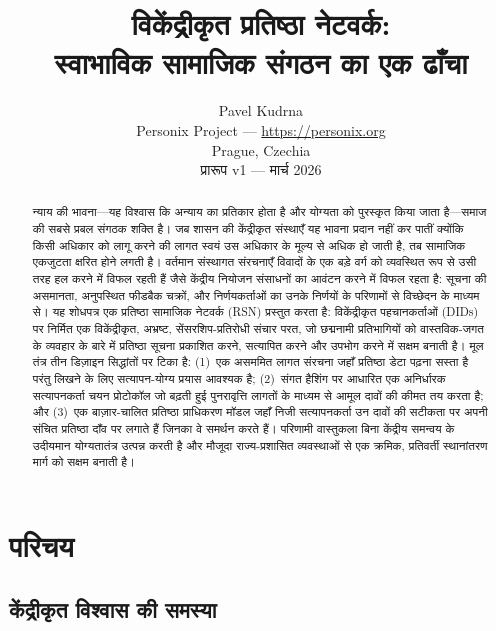\documentclass[11pt,a4paper,twocolumn]{article}
\title{\textbf{विकेंद्रीकृत प्रतिष्ठा नेटवर्क:\\स्वाभाविक सामाजिक संगठन का एक ढाँचा}}
\author{Pavel Kudrna\\Personix Project --- \url{https://personix.org}\\Prague, Czechia\\प्रारूप v1 --- मार्च 2026}
\date{}
\begin{document}
\maketitle

\begin{abstract}
न्याय की भावना---यह विश्वास कि अन्याय का प्रतिकार होता है और योग्यता को पुरस्कृत किया जाता है---समाज की सबसे प्रबल संगठक शक्ति है। जब शासन की केंद्रीकृत संस्थाएँ यह भावना प्रदान नहीं कर पातीं क्योंकि किसी अधिकार को लागू करने की लागत स्वयं उस अधिकार के मूल्य से अधिक हो जाती है, तब सामाजिक एकजुटता क्षरित होने लगती है। वर्तमान संस्थागत संरचनाएँ विवादों के एक बड़े वर्ग को व्यवस्थित रूप से उसी तरह हल करने में विफल रहती हैं जैसे केंद्रीय नियोजन संसाधनों का आवंटन करने में विफल रहता है: सूचना की असमानता, अनुपस्थित फीडबैक चक्रों, और निर्णयकर्ताओं का उनके निर्णयों के परिणामों से विच्छेदन के माध्यम से। यह शोधपत्र एक प्रतिष्ठा सामाजिक नेटवर्क (RSN) प्रस्तुत करता है: विकेंद्रीकृत पहचानकर्ताओं (DIDs) पर निर्मित एक विकेंद्रीकृत, अभ्रष्ट, सेंसरशिप-प्रतिरोधी संचार परत, जो छद्मनामी प्रतिभागियों को वास्तविक-जगत के व्यवहार के बारे में प्रतिष्ठा सूचना प्रकाशित करने, सत्यापित करने और उपभोग करने में सक्षम बनाती है। मूल तंत्र तीन डिज़ाइन सिद्धांतों पर टिका है: (1)~एक असममित लागत संरचना जहाँ प्रतिष्ठा डेटा पढ़ना सस्ता है परंतु लिखने के लिए सत्यापन-योग्य प्रयास आवश्यक है; (2)~संगत हैशिंग पर आधारित एक अनिर्धारक सत्यापनकर्ता चयन प्रोटोकॉल जो बढ़ती हुई पुनरावृत्ति लागतों के माध्यम से आमूल दावों की कीमत तय करता है; और (3)~एक बाज़ार-चालित प्रतिष्ठा प्राधिकरण मॉडल जहाँ निजी सत्यापनकर्ता उन दावों की सटीकता पर अपनी संचित प्रतिष्ठा दाँव पर लगाते हैं जिनका वे समर्थन करते हैं। परिणामी वास्तुकला बिना केंद्रीय समन्वय के उदीयमान योग्यतातंत्र उत्पन्न करती है और मौजूदा राज्य-प्रशासित व्यवस्थाओं से एक क्रमिक, प्रतिवर्ती स्थानांतरण मार्ग को सक्षम बनाती है।
\end{abstract}

\section{परिचय}

\subsection{केंद्रीकृत विश्वास की समस्या}
\end{document}
